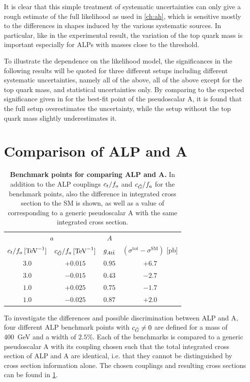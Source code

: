 It is clear that this simple treatment of systematic uncertainties can only give a rough estimate of the full likelihood as used in \cref{ch:ah}, which is sensitive mostly to the differences in shapes induced by the various systematic sources.
In particular, like in the experimental result, the variation of the top quark mass is important especially for ALPs with masses close to the \ttbar threshold.

To illustrate the dependence on the likelihood model, the significances in the following results will be quoted for three different setups including different systematic uncertainties, namely all of the above, all of the above except for the top quark mass, and statistical uncertainties only. By comparing to the expected significance given in  for the best-fit point of the pseudoscalar A, it is found that the full setup overestimates the uncertainty, while the setup without the top quark mass slightly underestimates it. 

\section{Comparison of ALP and A}
\label{sec:alps:ALPvsA}

\begin{table}
\centering
\begin{tabular}{cc |c | c}
\multicolumn{2}{c}{$a$} & $A$ \\
$c_t/f_a \,  [\text{TeV}^{-1}]$ & $c_{\tilde{G}}/f_a \,  [\text{TeV}^{-1}]$ & $g_{A\mathrm{t \bar{t}}}$ & $(\sigma^\text{tot}-\sigma^\text{SM})$ [pb] \\
\hline
\hline
$3.0$ & $+0.015$ & $0.95$ & $+6.7$ \\
$3.0$ & $-0.015$ & $0.43$ & $-2.7$ \\
$1.0$ & $+0.025$ & $0.75$ & $-1.7$ \\
$1.0$ & $-0.025$ & $0.87$ & $+2.0$ \\
\end{tabular}
\caption{\textbf{Benchmark points for comparing ALP and A.} In addition to the ALP couplings $c_t/f_a$ and $c_{\tilde{G}}/f_a$ for the benchmark points, also the difference in integrated cross section to the SM is shown, as well as a value of \gAtt corresponding to a generic pseudoscalar A with the same integrated cross section.}
\label{tab:alps:benchmarks}
\end{table}

To investigate the differences and possible discrimination between ALP and A, four different ALP benchmark points with $c_{\tilde{G}} \neq 0$ are defined for a mass of \SI{400}{\GeV} and a width of $2.5\%$. Each of the benchmarks is compared to a generic pseudoscalar A with its coupling \gAtt chosen such that the total integrated cross section of ALP and A are identical, i.e. that they cannot be distinguished by cross section information alone. The chosen couplings and resulting cross sections can be found in \cref{tab:alps:benchmarks}.

